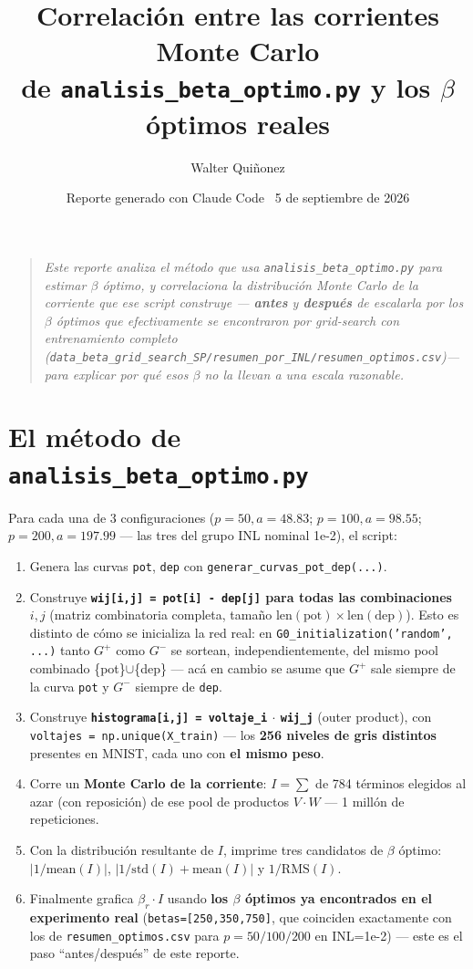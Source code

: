 \documentclass[11pt]{article}
\title{\textbf{Correlación entre las corrientes Monte Carlo\\
de \texttt{analisis\_beta\_optimo.py} y los $\beta$ óptimos reales}}
\author{Walter Quiñonez}
\date{Reporte generado con Claude Code \textperiodcentered\ 5 de septiembre de 2026}
\begin{document}
\maketitle

\begin{quote}\itshape
Este reporte analiza el método que usa \texttt{analisis\_beta\_optimo.py}
para estimar $\beta$ óptimo, y correlaciona la distribución Monte Carlo de
la corriente que ese script construye --- \textbf{antes} y
\textbf{después} de escalarla por los $\beta$ óptimos que efectivamente se
encontraron por grid-search con entrenamiento completo
(\texttt{data\_beta\_grid\_search\_SP/resumen\_por\_INL/resumen\_optimos.csv})---
para explicar por qué esos $\beta$ no la llevan a una escala razonable.
\end{quote}

\tableofcontents

\section{El método de \texttt{analisis\_beta\_optimo.py}}

Para cada una de 3 configuraciones ($p{=}50,a{=}48.83$; $p{=}100,a{=}98.55$;
$p{=}200,a{=}197.99$ --- las tres del grupo INL nominal 1e-2), el script:

\begin{enumerate}
\item Genera las curvas \texttt{pot}, \texttt{dep} con
  \texttt{generar\_curvas\_pot\_dep(...)}.
\item Construye \textbf{\texttt{wij[i,j] = pot[i] - dep[j]} para todas las
  combinaciones $i,j$} (matriz combinatoria completa, tamaño
  $\mathrm{len(pot)}\times\mathrm{len(dep)}$). Esto es distinto de cómo se
  inicializa la red real: en \texttt{G0\_initialization('random', ...)}
  tanto $G^+$ como $G^-$ se sortean, independientemente, del mismo pool
  combinado \{pot\}$\cup$\{dep\} --- acá en cambio se asume que $G^+$ sale
  siempre de la curva \texttt{pot} y $G^-$ siempre de \texttt{dep}.
\item Construye \textbf{\texttt{histograma[i,j] = voltaje\_i} $\cdot$
  \texttt{wij\_j}} (outer product), con \texttt{voltajes =
  np.unique(X\_train)} --- los \textbf{256 niveles de gris distintos}
  presentes en MNIST, cada uno con \textbf{el mismo peso}.
\item Corre un \textbf{Monte Carlo de la corriente}: $I=\sum$ de 784
  términos elegidos al azar (con reposición) de ese pool de productos
  $V{\cdot}W$ --- 1 millón de repeticiones.
\item Con la distribución resultante de $I$, imprime tres candidatos de
  $\beta$ óptimo: $|1/\mathrm{mean}(I)|$,
  $|1/\mathrm{std}(I)+\mathrm{mean}(I)|$ y $1/\mathrm{RMS}(I)$.
\item Finalmente grafica $\beta_r \cdot I$ usando \textbf{los $\beta$
  óptimos ya encontrados en el experimento real}
  (\texttt{betas=[250,350,750]}, que coinciden exactamente con los de
  \texttt{resumen\_optimos.csv} para $p{=}50/100/200$ en INL=1e-2) --- este
  es el paso ``antes/después'' de este reporte.
\end{enumerate}
\end{document}
